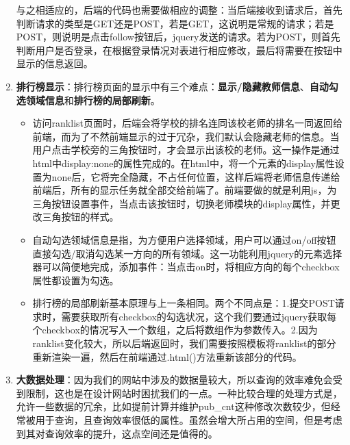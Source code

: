\begin{enumerate}
与之相适应的，后端的代码也需要做相应的调整：当后端接收到请求后，首先判断请求的类型是GET还是POST，若是GET，这说明是常规的请求；若是POST，则说明是点击follow按钮后，jquery发送的请求。若为POST，则首先判断用户是否登录，在根据登录情况对表进行相应修改，最后将需要在按钮中显示的信息返回。

\item {\bf 排行榜显示}：排行榜页面的显示中有三个难点：{\bf 显示/隐藏教师信息}、{\bf 自动勾选领域信息}和{\bf 排行榜的局部刷新}。
\begin{itemize}
\item 访问ranklist页面时，后端会将学校的排名连同该校老师的排名一同返回给前端，而为了不然前端显示的过于冗杂，我们默认会隐藏老师的信息。当用户点击学校旁的三角按钮时，才会显示出该校的老师。这一操作是通过html中display:none的属性完成的。在html中，将一个元素的display属性设置为none后，它将完全隐藏，不占任何位置，这样后端将老师信息传递给前端后，所有的显示任务就全部交给前端了。前端要做的就是利用js，为三角按钮设置事件，当点击该按钮时，切换老师模块的display属性，并更改三角按钮的样式。
\item 自动勾选领域信息是指，为方便用户选择领域，用户可以通过on/off按钮直接勾选/取消勾选某一方向的所有领域。这一功能利用jquery的元素选择器可以简便地完成，添加事件：当点击on时，将相应方向的每个checkbox属性都设置为勾选。
\item 排行榜的局部刷新基本原理与上一条相同。两个不同点是：1.提交POST请求时，需要获取所有checkbox的勾选状况，这个我们要通过jquery获取每个checkbox的情况写入一个数组，之后将数组作为参数传入。2.因为ranklist变化较大，所以后端返回时，我们需要按照模板将ranklist的部分重新渲染一遍，然后在前端通过.html()方法重新该部分的代码。
\end{itemize}

\item {\bf 大数据处理}：因为我们的网站中涉及的数据量较大，所以查询的效率难免会受到限制，这也是在设计网站时困扰我们的一点。一种比较合理的处理方式是，允许一些数据的冗余，比如提前计算并维护pub\_cnt这种修改次数较少，但经常被用于查询，且查询效率很低的属性。虽然会增大所占用的空间，但是考虑到其对查询效率的提升，这点空间还是值得的。
\end{enumerate}


